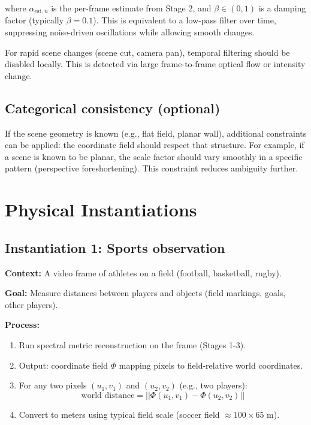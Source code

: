 \documentclass[11pt,twocolumn,a4paper]{article}
\theoremstyle{definition}
\begin{document}
where $\alpha_{\text{est},n}$ is the per-frame estimate from Stage 2, and $\beta \in (0,1)$ is a damping factor (typically $\beta = 0.1$). This is equivalent to a low-pass filter over time, suppressing noise-driven oscillations while allowing smooth changes.

For rapid scene changes (scene cut, camera pan), temporal filtering should be disabled locally. This is detected via large frame-to-frame optical flow or intensity change.

\subsection{Categorical consistency (optional)}

If the scene geometry is known (e.g., flat field, planar wall), additional constraints can be applied: the coordinate field should respect that structure. For example, if a scene is known to be planar, the scale factor should vary smoothly in a specific pattern (perspective foreshortening). This constraint reduces ambiguity further.

\section{Physical Instantiations}
\label{sec:instances}

\subsection{Instantiation 1: Sports observation}

\textbf{Context:} A video frame of athletes on a field (football, basketball, rugby).

\textbf{Goal:} Measure distances between players and objects (field markings, goals, other players).

\textbf{Process:}

\begin{enumerate}[leftmargin=1.4em]
  \item Run spectral metric reconstruction on the frame (Stages 1-3).
  \item Output: coordinate field $\Phi$ mapping pixels to field-relative world coordinates.
  \item For any two pixels $(u_1, v_1)$ and $(u_2, v_2)$ (e.g., two players):
    \begin{equation}
    \text{world distance} = ||\Phi(u_1, v_1) - \Phi(u_2, v_2)||
    \end{equation}
  \item Convert to meters using typical field scale (soccer field $\approx 100 \times 65$ m).
\end{enumerate}
\end{document}
